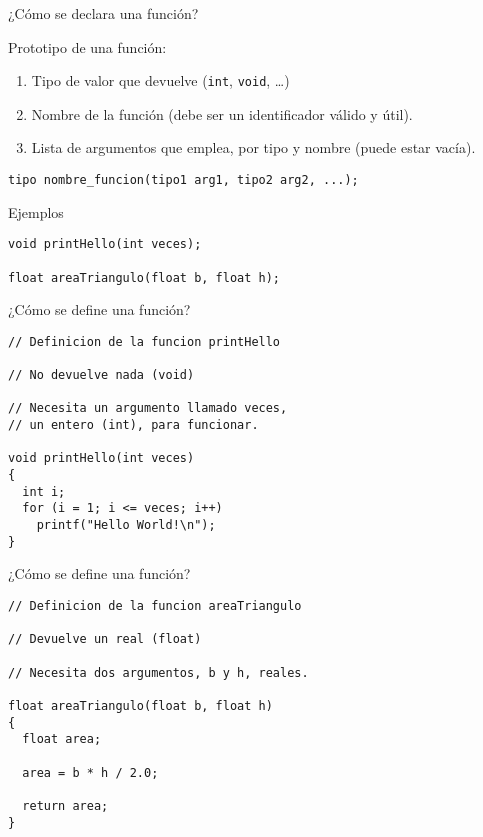 \documentclass[xcolor={usenames,svgnames,dvipsnames}, aspectratio=169]{beamer}
\begin{document}
\begin{frame}[label={sec:org92612dd},fragile]{¿Cómo se declara una función?}
 \begin{block}{Prototipo de una función:}
\begin{enumerate}
\item Tipo de valor que devuelve (\texttt{int}, \texttt{void}, \ldots{})
\item Nombre de la función (debe ser un identificador válido y \alert{útil}).
\item Lista de argumentos que emplea, por tipo y nombre (puede estar vacía).
\end{enumerate}

\lstset{language=C,label= ,caption= ,captionpos=b,numbers=none}
\begin{lstlisting}
tipo nombre_funcion(tipo1 arg1, tipo2 arg2, ...);
\end{lstlisting}
\end{block}
\begin{block}{Ejemplos}
\lstset{language=C,label= ,caption= ,captionpos=b,numbers=none}
\begin{lstlisting}
void printHello(int veces);

float areaTriangulo(float b, float h);
\end{lstlisting}
\end{block}
\end{frame}
\begin{frame}[label={sec:orge4a3c88},fragile]{¿Cómo se define una función?}
 \lstset{language=C,label= ,caption= ,captionpos=b,numbers=none}
\begin{lstlisting}
// Definicion de la funcion printHello

// No devuelve nada (void)

// Necesita un argumento llamado veces,
// un entero (int), para funcionar.

void printHello(int veces)
{
  int i;
  for (i = 1; i <= veces; i++)
    printf("Hello World!\n");
}
\end{lstlisting}
\end{frame}
\begin{frame}[label={sec:orged7b549},fragile]{¿Cómo se define una función?}
 \lstset{language=C,label= ,caption= ,captionpos=b,numbers=none}
\begin{lstlisting}
// Definicion de la funcion areaTriangulo

// Devuelve un real (float)

// Necesita dos argumentos, b y h, reales.

float areaTriangulo(float b, float h)
{
  float area;

  area = b * h / 2.0;

  return area;
}
\end{lstlisting}
\end{frame}
\end{document}
